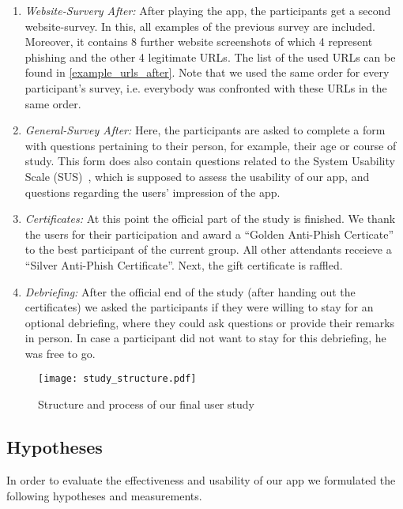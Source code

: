 \begin{enumerate}
	\item \textit{Website-Survery After:} After playing the app, the participants get a second website-survey.
 In this, all examples of the previous survey are included.
 Moreover, it contains 8 further website screenshots of which 4 represent phishing and the other 4 legitimate URLs.
  The list of the used URLs can be found in \autoref{example_urls_after}.
Note that we used the same order for every participant's survey, i.e. everybody was confronted with these URLs in the same order.

	\item \textit{General-Survey After:} Here, the participants are asked to complete a form with questions pertaining to their person, for example, their age or course of study.
 This form does also contain questions related to the System Usability Scale (SUS)~\cite{sus}, which is supposed to assess the usability of our app, and questions regarding the users' impression of the app.
	
	\item \textit{Certificates:} At this point the official part of the study is finished.
We thank the users for their participation and award a ``Golden Anti-Phish Certicate'' to the best participant of the current group.
All other attendants receieve a ``Silver Anti-Phish Certificate''.
Next, the gift certificate is raffled.

	\item \textit{Debriefing:} After the official end of the study (after handing out the certificates) we asked the participants if they were willing to stay for an optional debriefing, where they could ask questions or provide their remarks in person. In case a participant did not want to stay for this debriefing, he was free to go.
\end{enumerate}



\begin{figure}[hHtbp]
\centering
\texttt{[image: study\_structure.pdf]}%
\caption{Structure and process of our final user study}%
\label{fig:study_structure}%
\end{figure}

\subsection{Hypotheses}
In order to evaluate the effectiveness and usability of our app we formulated the following hypotheses and measurements.

